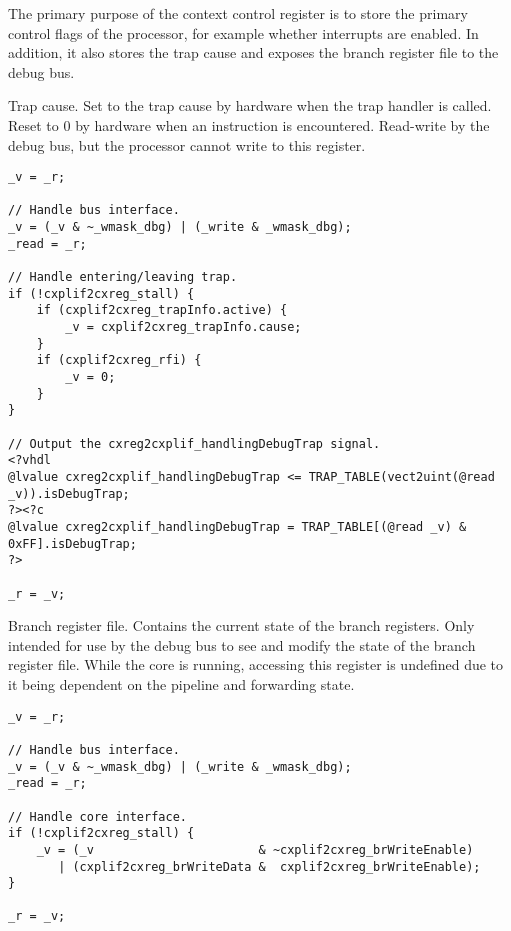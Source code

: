 

The primary purpose of the context control register is to store the primary
control flags of the processor, for example whether interrupts are enabled. In
addition, it also stores the trap cause and exposes the branch register file to
the debug bus.

Trap cause. Set to the trap cause by hardware when the trap handler is called. 
Reset to 0 by hardware when an  instruction is encountered. Read-write 
by the debug bus, but the processor cannot write to this register.

\declaration{}
\implementation{}
\begin{lstlisting}
_v = _r;

// Handle bus interface.
_v = (_v & ~_wmask_dbg) | (_write & _wmask_dbg);
_read = _r;

// Handle entering/leaving trap.
if (!cxplif2cxreg_stall) {
    if (cxplif2cxreg_trapInfo.active) {
        _v = cxplif2cxreg_trapInfo.cause;
    }
    if (cxplif2cxreg_rfi) {
        _v = 0;
    }
}

// Output the cxreg2cxplif_handlingDebugTrap signal.
<?vhdl
@lvalue cxreg2cxplif_handlingDebugTrap <= TRAP_TABLE(vect2uint(@read _v)).isDebugTrap;
?><?c
@lvalue cxreg2cxplif_handlingDebugTrap = TRAP_TABLE[(@read _v) & 0xFF].isDebugTrap;
?>

_r = _v;
\end{lstlisting}

Branch register file. Contains the current state of the branch registers. Only
intended for use by the debug bus to see and modify the state of the branch
register file. While the core is running, accessing this register is undefined
due to it being dependent on the pipeline and forwarding state.

\declaration{}
\implementation{}
\begin{lstlisting}
_v = _r;

// Handle bus interface.
_v = (_v & ~_wmask_dbg) | (_write & _wmask_dbg);
_read = _r;

// Handle core interface.
if (!cxplif2cxreg_stall) {
    _v = (_v                       & ~cxplif2cxreg_brWriteEnable)
       | (cxplif2cxreg_brWriteData &  cxplif2cxreg_brWriteEnable);
}

_r = _v;
\end{lstlisting}

